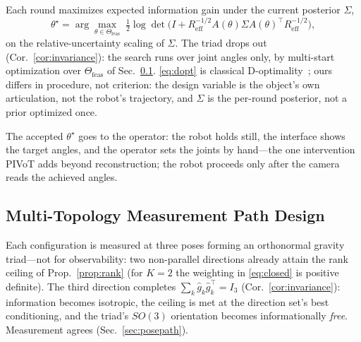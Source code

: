 Each round maximizes expected information gain under the current posterior
$\Sigma$,
%
\begin{equation}
\theta^\star=\arg\max_{\theta\in\Theta_{\mathrm{feas}}}\;
\tfrac{1}{2}\log\det\!\big(I+R_{\mathrm{eff}}^{-1/2}A(\theta)\Sigma
A(\theta)^{\!\top}\!R_{\mathrm{eff}}^{-1/2}\big),
\label{eq:dopt}
\end{equation}
%
on the relative-uncertainty scaling of $\Sigma$. The triad drops out
(Cor.~\ref{cor:invariance}): the search runs over joint angles only, by
multi-start optimization over $\Theta_{\mathrm{feas}}$ of
Sec.~\ref{sec:path}. \eqref{eq:dopt} is classical
D-optimality~\cite{gautier1992exciting,swevers1997optimal};
ours differs in procedure, not criterion: the design variable is the
object's own articulation, not the robot's trajectory, and $\Sigma$ is the
per-round posterior, not a prior optimized once.

The accepted $\theta^\star$ goes to the operator: the robot holds still, the
interface shows the target angles, and the operator sets the joints by
hand---the one intervention PIVoT adds beyond reconstruction; the robot
proceeds only after the camera reads the achieved angles.

\subsection{Multi-Topology Measurement Path Design}
\label{sec:path}

Each configuration is measured at three poses forming an orthonormal gravity
triad---not for observability: two non-parallel directions already attain the
rank ceiling of Prop.~\ref{prop:rank} (for $K=2$ the weighting in
\eqref{eq:closed} is positive definite). The third direction completes
$\sum_k\hat g_k\hat g_k^{\!\top}=I_3$ (Cor.~\ref{cor:invariance}):
information becomes isotropic, the ceiling is met at the direction set's best
conditioning, and the triad's $SO(3)$ orientation becomes informationally
\emph{free}. Measurement agrees (Sec.~\ref{sec:posepath}).

